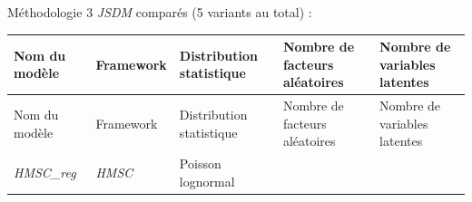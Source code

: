 \documentclass[%
]{beamer}
\begin{document}
	\begin{frame}{Méthodologie}
	3 \emph{JSDM} comparés (5 variants au total) :
	\begin{scriptsize}
		\begin{longtable}[]{lllll}
		\toprule
		\begin{minipage}[b]{0.11\columnwidth}\raggedright
		Nom du modèle\strut
		\end{minipage} & \begin{minipage}[b]{0.09\columnwidth}\raggedright
		Framework\strut
		\end{minipage} & \begin{minipage}[b]{0.19\columnwidth}\raggedright
		Distribution statistique\strut
		\end{minipage} & \begin{minipage}[b]{0.24\columnwidth}\raggedright
		Nombre de facteurs aléatoires\strut
		\end{minipage} & \begin{minipage}[b]{0.22\columnwidth}\raggedright
		Nombre de variables latentes\strut
		\end{minipage}\tabularnewline
		\toprule
		\endfirsthead
		\toprule
		\begin{minipage}[b]{0.11\columnwidth}\raggedright
		Nom du modèle\strut
		\end{minipage} & \begin{minipage}[b]{0.09\columnwidth}\raggedright
		Framework\strut
		\end{minipage} & \begin{minipage}[b]{0.19\columnwidth}\raggedright
		Distribution statistique\strut
		\end{minipage} & \begin{minipage}[b]{0.24\columnwidth}\raggedright
		Nombre de facteurs aléatoires\strut
		\end{minipage} & \begin{minipage}[b]{0.22\columnwidth}\raggedright
		Nombre de variables latentes\strut
		\end{minipage}\tabularnewline
		\toprule
		\endhead
		\begin{minipage}[t]{0.11\columnwidth}\raggedright
		\emph{HMSC\_reg}\strut
		\end{minipage} & \begin{minipage}[t]{0.09\columnwidth}\raggedright
		\emph{HMSC}\strut
		\end{minipage} & \begin{minipage}[t]{0.19\columnwidth}\raggedright
		Poisson lognormal\strut
		\end{minipage} & \begin{minipage}[t]{0.24\columnwidth}\raggedright

\end{minipage}
\end{longtable}
\end{scriptsize}
\end{frame}
\end{document}
